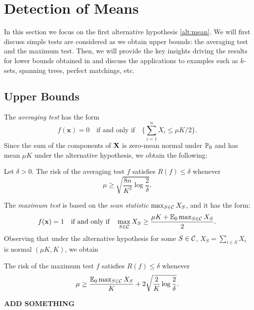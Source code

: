 \documentclass[10pt, oneside]{article}
\begin{document}
\section{Detection of Means}
In this section we focus on the first alternative hypothesis \ref{alt:mean}. We will first discuss simple tests are considered as we obtain upper bounds: the averaging test and the maximum test. Then, we will provide the key insights driving the results for lower bounds obtained in \cite{addario2010combinatorial} and discuss the applications to examples such as $k$-sets, spanning trees, perfect matchings, etc.


\subsection{Upper Bounds}
The \textit{averaging test} has the form
\[
f(\mathbf{x}) = 0  \quad\mbox{if and only if}\quad {\{ \sum_{i=1}^n X_i \le \mu K/2 \}}.
\]
Since the sum of the components of $\mathbf{X}$ is zero-mean normal under $\mathbb{P}_0$
and has mean $\mu K$ under the alternative hypothesis, we obtain the following:
\begin{prop}
  \label{average}
  Let $\delta>0$. The risk of the averaging test $f$ satisfies
  $R(f) \le\delta$
  whenever
  \[
  \mu\ge\sqrt{\frac{8n}{K^2} \log\frac{2}{\delta}}.
  \]
\end{prop}

The \textit{maximum test} is based on the \textit{scan statistic} $\max_{S\in{\mathcal C}} X_S$, and it has the form:
%
\[
f(\mathbf{x}) = 1 \quad\mbox{if and only if}\quad
\max_{S\in{\mathcal C}} X_S\ge\frac{\mu K + \mathbb{E}_0 \max_{S\in{\mathcal C}} X_S}{2}.
\]
Observing that under the alternative hypothesis for some $S\in{\mathcal C}$, $X_S= \sum_{i\in S} X_i$ is normal
$(\mu K, K)$, we obtain
\begin{prop}
  \label{maxtest}
  The risk of the maximum test $f$ satisfies
  $R(f) \le\delta$ whenever
  \[
  \mu\ge\frac{\mathbb{E}_0 \max_{S\in{\mathcal C}} X_S}{K} + 2\sqrt{\frac{2}{K}
  \log
  \frac{2}{\delta}}.
  \]
\end{prop}

{\bf ADD SOMETHING}
\end{document}
